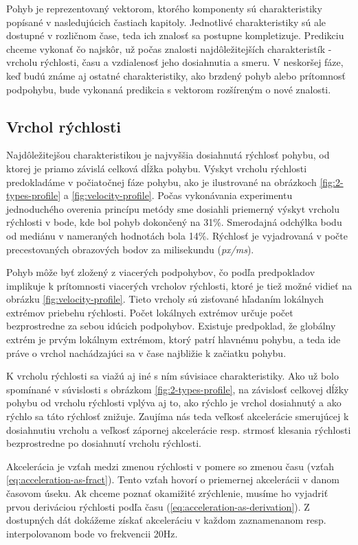 Pohyb je reprezentovaný vektorom, ktorého komponenty sú charakteristiky popísané v nasledujúcich častiach kapitoly. Jednotlivé charakteristiky sú ale dostupné v rozličnom čase, teda ich znalosť sa postupne kompletizuje. Predikciu chceme vykonať čo najskôr, už počas znalosti najdôležitejších charakteristík - vrcholu rýchlosti, času a vzdialenosť jeho dosiahnutia a smeru. V neskoršej fáze, keď budú známe aj ostatné charakteristiky, ako brzdený pohyb alebo prítomnosť podpohybu, bude vykonaná predikcia s vektorom rozšíreným o nové znalosti.

\subsection{Vrchol rýchlosti}\label{sec:propose-veloctiy-peak}
Najdôležitejšou charakteristikou je najvyššia dosiahnutá rýchlosť pohybu, od ktorej je priamo závislá celková dĺžka pohybu. Výskyt vrcholu rýchlosti predokladáme v počiatočnej fáze pohybu, ako je ilustrované na obrázkoch \ref{fig:2-types-profile} a \ref{fig:velocity-profile}. Počas vykonávania experimentu jednoduchého overenia princípu metódy sme dosiahli priemerný výskyt vrcholu rýchlosti v bode, kde bol pohyb dokončený na 31\%. Smerodajná odchýlka bodu od mediánu v nameraných hodnotách bola 14\%. Rýchlosť je vyjadrovaná v počte precestovaných obrazových bodov za milisekundu (\emph{px/ms}).

Pohyb môže byť zložený z viacerých podpohybov, čo podľa predpokladov implikuje k prítomnosti viacerých vrcholov rýchlosti, ktoré je tiež možné vidieť na obrázku \ref{fig:velocity-profile}. Tieto vrcholy sú zisťované hľadaním lokálnych extrémov priebehu rýchlosti. Počet lokálnych extrémov určuje počet bezprostredne za sebou idúcich podpohybov. Existuje predpoklad, že globálny extrém je prvým lokálnym extrémom, ktorý patrí hlavnému pohybu, a teda ide práve o vrchol nachádzajúci sa v čase najbližie k začiatku pohybu.

K vrcholu rýchlosti sa viažú aj iné s ním súvisiace charakteristiky. Ako už bolo spomínané v súvislosti s obrázkom \ref{fig:2-types-profile}, na závislosť celkovej dĺžky pohybu od vrcholu rýchlosti vplýva aj to, ako rýchlo je vrchol dosiahnutý a ako rýchlo sa táto rýchlosť znižuje. Zaujíma nás teda veľkosť akcelerácie smerujúcej k dosiahnutiu vrcholu a veľkosť zápornej akcelerácie resp. strmosť klesania rýchlosti bezprostredne po dosiahnutí vrcholu rýchlosti. 

Akcelerácia je vzťah medzi zmenou rýchlosti v pomere so zmenou času (vzťah \ref{eq:acceleration-as-fract}). Tento vzťah hovorí o priemernej akcelerácii v danom časovom úseku. Ak chceme poznať okamižité zrýchlenie, musíme ho vyjadriť prvou deriváciou rýchlosti podľa času (\ref{eq:acceleration-as-derivation}). Z dostupných dát dokážeme získať akceleráciu v každom zaznamenanom resp. interpolovanom bode vo frekvencii 20Hz. 

